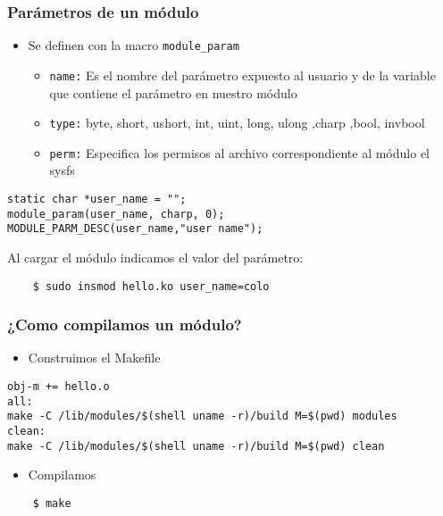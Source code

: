 \begin{frame}[fragile]
\frametitle{Parámetros de un módulo}
  \begin{itemize}
  \item Se definen con la macro \texttt{module\_param}
  \begin{itemize}
   \item \texttt{name:} Es el nombre del parámetro expuesto al usuario y de la variable que contiene el parámetro en nuestro módulo
   \item \texttt{type:} byte, short, ushort, int, uint, long, ulong ,charp ,bool, invbool
   \item \texttt{perm:} Especifica los permisos al archivo correspondiente al módulo el sysfs
  \end{itemize}

  \end{itemize}
\begin{lstlisting}
static char *user_name = "";
module_param(user_name, charp, 0);  
MODULE_PARM_DESC(user_name,"user name");
\end{lstlisting}

Al cargar el módulo indicamos el valor del parámetro:

\begin{lstlisting}
    $ sudo insmod hello.ko user_name=colo
\end{lstlisting}

\end{frame}


\begin{frame}[fragile]
\frametitle{¿Como compilamos un módulo?}
  \begin{itemize}
  \item Construimos el Makefile
  \end{itemize}
\begin{lstlisting}
obj-m += hello.o
all:
make -C /lib/modules/$(shell uname -r)/build M=$(pwd) modules
clean:
make -C /lib/modules/$(shell uname -r)/build M=$(pwd) clean
\end{lstlisting}
  \begin{itemize}
  \item Compilamos
  \end{itemize}
\begin{lstlisting}
    $ make
\end{lstlisting}

\end{frame}



